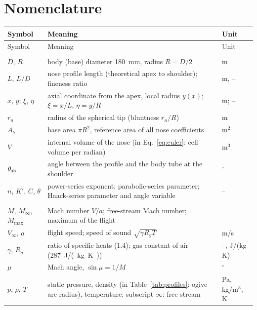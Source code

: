 \section*{Nomenclature}

{\small
\renewcommand{\arraystretch}{1.02}
\begin{longtable}{@{}>{\raggedright\arraybackslash}p{2.7cm}>{\raggedright\arraybackslash}p{11.0cm}>{\raggedright\arraybackslash}p{1.9cm}@{}}
\toprule
Symbol & Meaning & Unit \\
\midrule
\endfirsthead
\toprule
Symbol & Meaning & Unit \\
\midrule
\endhead
\bottomrule
\endfoot
\multicolumn{3}{@{}l}{\textit{Geometry}} \\
$D$, $R$ & body (base) diameter \SI{180}{mm}, radius $R = D/2$ & m \\
$L$, $L/D$ & nose profile length (theoretical apex to shoulder); fineness ratio & m, -- \\
$x$, $y$; $\xi$, $\eta$ & axial coordinate from the apex, local radius $y(x)$; $\xi = x/L$, $\eta = y/R$ & m; -- \\
$r_n$ & radius of the spherical tip (bluntness $r_n/R$) & m \\
$A_b$ & base area $\pi R^2$, reference area of all nose coefficients & m$^2$ \\
$V$ & internal volume of the nose (in Eq.~\eqref{eq:euler}: cell volume per radian) & m$^3$ \\
$\theta_{\rm sh}$ & angle between the profile and the body tube at the shoulder & $^\circ$ \\
$n$, $K'$, $C$, $\theta$ & power-series exponent; parabolic-series parameter; Haack-series parameter and angle variable & -- \\
\multicolumn{3}{@{}l}{\textit{Flow}} \\
$M$, $M_\infty$, $M_{\max}$ & Mach number $V/a$; free-stream Mach number; maximum of the flight & -- \\
$V_\infty$, $a$ & flight speed; speed of sound $\sqrt{\gamma R_g T}$ & m/s \\
$\gamma$, $R_g$ & ratio of specific heats (1.4); gas constant of air (\SI{287}{J/(kg.K)}) & --, J/(kg\,K) \\
$\mu$ & Mach angle, $\sin\mu = 1/M$ & $^\circ$ \\
$p$, $\rho$, $T$ & static pressure, density (in Table~\ref{tab:profiles}: ogive arc radius), temperature; subscript $\infty$: free stream & Pa, kg/m$^3$, K \\

\end{longtable}}
